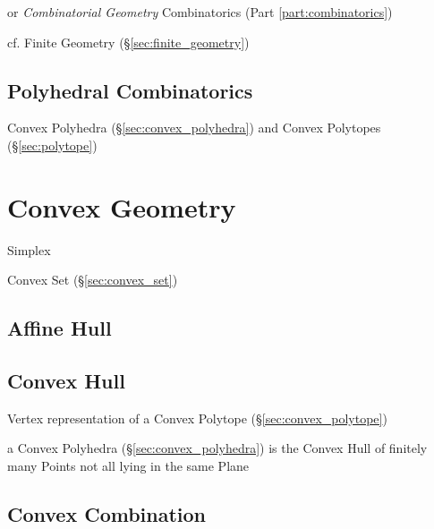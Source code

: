 or \emph{Combinatorial Geometry} \fist Combinatorics (Part
\ref{part:combinatorics})

cf. Finite Geometry (\S\ref{sec:finite_geometry})



\subsection{Polyhedral Combinatorics}\label{sec:polyhedral_combinatorics}

Convex Polyhedra (\S\ref{sec:convex_polyhedra}) and Convex Polytopes
(\S\ref{sec:polytope})



\section{Convex Geometry}\label{sec:convex_geometry}

Simplex

Convex Set (\S\ref{sec:convex_set})



\subsection{Affine Hull}\label{sec:affine_hull}

\subsection{Convex Hull}\label{sec:convex_hull}

Vertex representation of a Convex Polytope (\S\ref{sec:convex_polytope})

a Convex Polyhedra (\S\ref{sec:convex_polyhedra}) is the Convex Hull of
finitely many Points not all lying in the same Plane



\subsection{Convex Combination}\label{sec:convex_combination}

